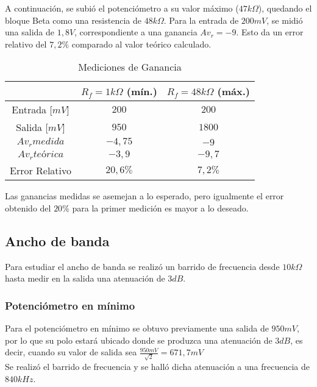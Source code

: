 \documentclass[letterpaper, 10 pt, conference]{ieeeconf}  %
\begin{document}
A continuación, se subió el potenciómetro a su valor máximo ($47k\Omega$), quedando el bloque Beta como una resistencia de $48k\Omega$.
Para la entrada de $200mV$, se midió una salida de $1,8V$, correspondiente a una ganancia $Av_r = -9$. Esto da un error relativo del $7,2\%$ comparado al valor teórico calculado.\\[em]

\begin{table}[h]
\begin{center}
\begin{tabular}{|c||c|c|}
\hline
 & $R_f = 1k\Omega$ (mín.) & $R_f = 48k\Omega$ (máx.) \\
\hline
Entrada [$mV$] & $200$ & $200$ \\
\hline
Salida [$mV$] & $950$ & $1800$ \\
\hline
$Av_r medida$ & $-4,75$ & $-9$ \\
\hline
$Av_r teórica$ & $-3,9$ & $-9,7$ \\
\hline
Error Relativo & $20,6\%$ & $7,2\%$ \\
\hline
\end{tabular}
\end{center}
\caption{Mediciones de Ganancia}
\label{tab:simple}
\end{table}


Las ganancias medidas se asemejan a lo esperado, pero igualmente el error obtenido del $20\%$ para la primer medición es mayor a lo deseado.

\subsection{\textbf{Ancho de banda}}

Para estudiar el ancho de banda se realizó un barrido de frecuencia desde $10k\Omega$ hasta medir en la salida una atenuación de $3dB$.\\[em]

\subsubsection{Potenciómetro en mínimo}
Para el potenciómetro en mínimo se obtuvo previamente una salida de $950mV$, por lo que su polo estará ubicado donde se produzca una atenuación de $3dB$, es decir, cuando su valor de salida sea $\frac{950mV}{\sqrt{2}} = 671,7mV$\\
Se realizó el barrido de frecuencia y se halló dicha atenuación a una frecuencia de $840kHz$.\\[em]
\end{document}
